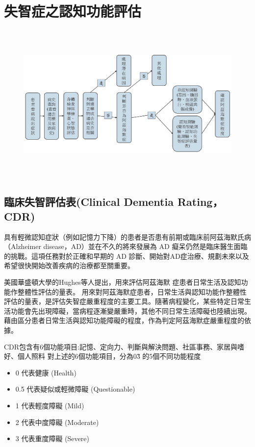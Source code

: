 
\chapter{失智症之認知功能評估}
\label{chapter:intro}


\begin{figure}[H]
	\centering
	\centerline{\includegraphics[height=8cm]{pic/ADprocess.PNG}}
	\label{fig:ADProcess}
\end{figure}

\section{臨床失智評估表(Clinical Dementia Rating，CDR)}

具有輕微認知症狀（例如記憶力下降）的患者是否患有前期或臨床前阿茲海默氏病（Alzheimer disease，AD）並在不久的將來發展為 AD 癡呆仍然是臨床醫生面臨的挑戰。這項任務對於正確和早期的 AD 診斷、開始對AD症治療、規劃未來以及希望很快開始改善疾病的治療都至關重要。

美國華盛頓大學的Hughes等人提出，用來評估阿茲海默 症患者日常生活及認知功能作整體性評估的量表。
用來對阿茲海默症患者，日常生活與認知功能作整體性評估的量表，是評估失智症嚴重程度的主要工具。隨著病程變化，某些特定日常生活功能會先出現障礙，當病程逐漸變嚴重時，其他不同日常生活障礙也陸續出現。藉由區分患者日常生活與認知功能障礙的程度，作為判定阿茲海默症嚴重程度的依據。


CDR包含有6個功能項目:記憶、定向力、判斷與解決問題、社區事務、家居與嗜好、個人照料
對上述的6個功能項目，分為0\~3 的5個不同功能程度

\begin{itemize}
    \item
    0 代表健康 (Health)
    \item
    0.5 代表疑似或輕微障礙 (Questionable)
    \item
    1 代表輕度障礙 (Mild)
    \item
    2 代表中度障礙 (Moderate)
    \item
    3 代表重度障礙 (Severe)
\end{itemize}


